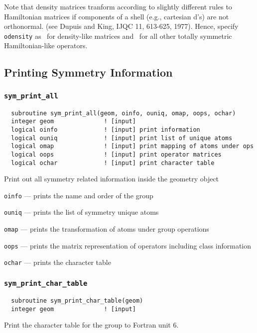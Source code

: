 Note that density matrices tranform according to slightly different
rules to Hamiltonian matrices if components of a shell (e.g.,
cartesian d's) are not orthonormal.  (see Dupuis and King, IJQC 11,
613-625, 1977).  Hence, specify \verb+odensity+ as \TRUE\ for
density-like matrices and \FALSE\ for all other totally symmetric
Hamiltonian-like operators.

\subsection{Printing Symmetry Information}

\subsubsection{{\tt sym\_print\_all}}
\begin{verbatim}
  subroutine sym_print_all(geom, oinfo, ouniq, omap, oops, ochar)
  integer geom              ! [input]
  logical oinfo             ! [input] print information
  logical ouniq             ! [input] print list of unique atoms
  logical omap              ! [input] print mapping of atoms under ops
  logical oops              ! [input] print operator matrices
  logical ochar             ! [input] print character table
\end{verbatim}
Print out all symmetry related information inside the geometry object
\begin{description}
\item{\tt oinfo} --- prints the name and order of the group
\item{\tt ouniq} --- prints the list of symmetry unique atoms
\item{\tt omap} --- prints the transformation of atoms under group operations
\item{\tt oops} --- prints the matrix representation of operators including
  class information
\item {\tt ochar} --- prints the character table
\end{description}

\subsubsection{{\tt sym\_print\_char\_table}}
\begin{verbatim}
  subroutine sym_print_char_table(geom)
  integer geom              ! [input]
\end{verbatim}
Print the character table for the group to Fortran unit 6.


